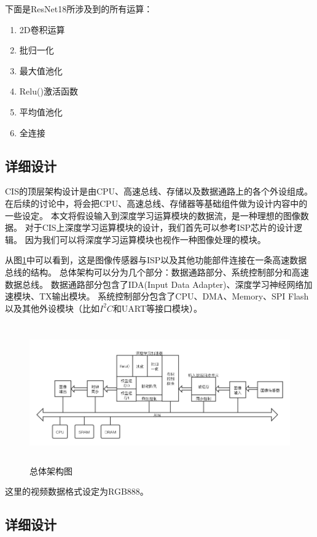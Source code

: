 下面是ResNet18所涉及到的所有运算：
\begin{enumerate}
    \item 2D卷积运算
    \item 批归一化
    \item 最大值池化
    \item Relu()激活函数
    \item 平均值池化
    \item 全连接
\end{enumerate}


\subsection{详细设计}
CIS的顶层架构设计是由CPU、高速总线、存储以及数据通路上的各个外设组成。
在后续的讨论中，将会把CPU、高速总线、存储器等基础组件做为设计内容中的一些设定。
本文将假设输入到深度学习运算模块的数据流，是一种理想的图像数据。
对于CIS上深度学习运算模块的设计，我们首先可以参考ISP芯片的设计逻辑。
因为我们可以将深度学习运算模块也视作一种图像处理的模块。

从图\ref{fig:top_arch}中可以看到，这是图像传感器与ISP以及其他功能部件连接在一条高速数据总线的结构。
总体架构可以分为几个部分：数据通路部分、系统控制部分和高速数据总线。
数据通路部分包含了IDA(Input Data Adapter)、深度学习神经网络加速模块、TX输出模块。
系统控制部分包含了CPU、DMA、Memory、SPI Flash以及其他外设模块（比如$I^2C$和UART等接口模块）。
\begin{figure}[htbp]
    \centering
    \includegraphics[width=15cm,height=6cm]{figures/top_arch.png}
    \caption{总体架构图}
    \label{fig:top_arch}
\end{figure}
这里的视频数据格式设定为RGB888。



\subsection{详细设计}

